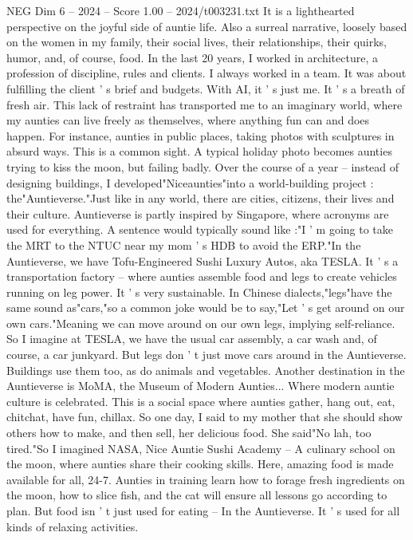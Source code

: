 \begin{textsample}{NEG Dim 6 – 2024 – Score 1.00 – 2024/t003231.txt}
It is a lighthearted perspective on the joyful side of auntie life.
Also a surreal narrative, loosely based on the women in my family, their social lives, their relationships, their quirks, humor, and, of course, food.
In the last 20 years, I worked in architecture, a profession of discipline, rules and clients.
I always worked in a team.
It was about fulfilling the client ' s brief and budgets.
With AI, it ' s just me.
It ' s a breath of fresh air.
This lack of restraint has transported me to an imaginary world, where my aunties can live freely as themselves, where anything fun can and does happen.
For instance, aunties in public places, taking photos with sculptures in absurd ways.
This is a common sight.
A typical holiday photo becomes aunties trying to kiss the moon, but failing badly.
Over the course of a year -- instead of designing buildings, I developed"Niceaunties"into a world-building project : the"Auntieverse."Just like in any world, there are cities, citizens, their lives and their culture.
Auntieverse is partly inspired by Singapore, where acronyms are used for everything.
A sentence would typically sound like :"I ' m going to take the MRT to the NTUC near my mom ' s HDB to avoid the ERP."In the Auntieverse, we have Tofu-Engineered Sushi Luxury Autos, aka TESLA.
It ' s a transportation factory -- where aunties assemble food and legs to create vehicles running on leg power.
It ' s very sustainable.
In Chinese dialects,"legs"have the same sound as"cars,"so a common joke would be to say,"Let ' s get around on our own cars."Meaning we can move around on our own legs, implying self-reliance.
So I imagine at TESLA, we have the usual car assembly, a car wash and, of course, a car junkyard.
But legs don ' t just move cars around in the Auntieverse.
Buildings use them too, as do animals and vegetables.
Another destination in the Auntieverse is MoMA, the Museum of Modern Aunties...
Where modern auntie culture is celebrated.
This is a social space where aunties gather, hang out, eat, chitchat, have fun, chillax.
So one day, I said to my mother that she should show others how to make, and then sell, her delicious food.
She said"No lah, too tired."So I imagined NASA, Nice Auntie Sushi Academy -- A culinary school on the moon, where aunties share their cooking skills.
Here, amazing food is made available for all, 24-7.
Aunties in training learn how to forage fresh ingredients on the moon, how to slice fish, and the cat will ensure all lessons go according to plan.
But food isn ' t just used for eating -- In the Auntieverse.
It ' s used for all kinds of relaxing activities.

\end{textsample}
